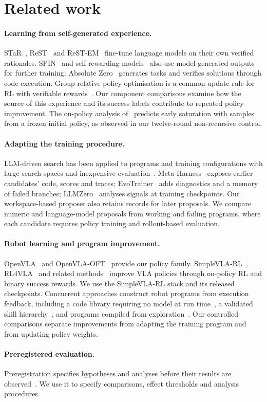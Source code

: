 \section{Related work}
\label{sec:related}

\paragraph{Learning from self-generated experience.} STaR~\cite{zelikman2022star}, ReST~\cite{gulcehre2023rest} and ReST-EM~\cite{singh2024restem} fine-tune language models on their own verified rationales. SPIN~\cite{chen2024spin} and self-rewarding models~\cite{yuan2024selfrewarding} also use model-generated outputs for further training; Absolute Zero~\cite{zhao2025absolutezero} generates tasks and verifies solutions through code execution. Group-relative policy optimisation is a common update rule for RL with verifiable rewards~\cite{shao2024deepseekmath,guo2025deepseekr1}. Our component comparisons examine how the source of this experience and its success labels contribute to repeated policy improvement. The on-policy analysis of~\cite{kim2026coverage} predicts early saturation with samples from a frozen initial policy, as observed in our twelve-round non-recursive control.

\paragraph{Adapting the training procedure.} LLM-driven search has been applied to programs and training configurations with large search spaces and inexpensive evaluation~\cite{novikov2025alphaevolve,lu2024aiscientist,hu2024adas}. Meta-Harness~\cite{lee2026metaharness} exposes earlier candidates' code, scores and traces; EvoTrainer~\cite{chen2026evotrainer} adds diagnostics and a memory of failed branches; LLMZero~\cite{fang2026llmzero} analyses signals at training checkpoints. Our workspace-based proposer also retains records for later proposals. We compare numeric and language-model proposals from working and failing programs, where each candidate requires policy training and rollout-based evaluation.

\paragraph{Robot learning and program improvement.} OpenVLA~\cite{kim2024openvla} and OpenVLA-OFT~\cite{kim2025oft} provide our policy family. SimpleVLA-RL~\cite{li2025simplevlarl}, RL4VLA~\cite{liu2025rl4vla} and related methods~\cite{lu2025vlarl} improve VLA policies through on-policy RL and binary success rewards. We use the SimpleVLA-RL stack and its released checkpoints. Concurrent approaches construct robot programs from execution feedback, including a code library requiring no model at run time~\cite{hu2026coap}, a validated skill hierarchy~\cite{wen2026roborsi}, and programs compiled from exploration~\cite{huang2026rax}. Our controlled comparisons separate improvements from adapting the training program and from updating policy weights.

\paragraph{Preregistered evaluation.} Preregistration specifies hypotheses and analyses before their results are observed~\cite{nosek2018preregistration,bertinetto2021preregistration}. We use it to specify comparisons, effect thresholds and analysis procedures.
